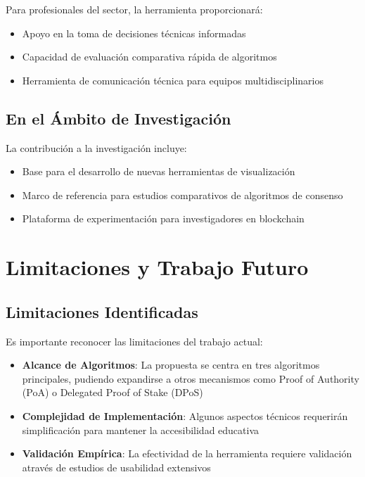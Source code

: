 \documentclass[spanish,12pt,letterpaper]{report}
\begin{document}
Para profesionales del sector, la herramienta proporcionará:

\begin{itemize}
    \item Apoyo en la toma de decisiones técnicas informadas
    \item Capacidad de evaluación comparativa rápida de algoritmos
    \item Herramienta de comunicación técnica para equipos multidisciplinarios
\end{itemize}

\subsection{En el Ámbito de Investigación}

La contribución a la investigación incluye:

\begin{itemize}
    \item Base para el desarrollo de nuevas herramientas de visualización
    \item Marco de referencia para estudios comparativos de algoritmos de consenso
    \item Plataforma de experimentación para investigadores en blockchain
\end{itemize}

\section{Limitaciones y Trabajo Futuro}

\subsection{Limitaciones Identificadas}

Es importante reconocer las limitaciones del trabajo actual:

\begin{itemize}
    \item \textbf{Alcance de Algoritmos}: La propuesta se centra en tres algoritmos principales, pudiendo expandirse a otros mecanismos como Proof of Authority (PoA) o Delegated Proof of Stake (DPoS)
    \item \textbf{Complejidad de Implementación}: Algunos aspectos técnicos requerirán simplificación para mantener la accesibilidad educativa
    \item \textbf{Validación Empírica}: La efectividad de la herramienta requiere validación através de estudios de usabilidad extensivos
\end{itemize}
\end{document}

